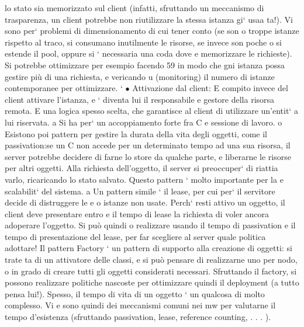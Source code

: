 \documentclass[a4paper,12pt]{article}
\begin{document}
lo stato sia memorizzato sul client (infatti, sfruttando un meccanismo di
trasparenza, un client potrebbe non riutilizzare la stessa istanza gi` usaa
ta!). Vi sono per` problemi di dimensionamento di cui tener conto (se son
o
troppe istanze rispetto al traco, si consumano inutilmente le risorse, se
invece son poche o si estende il pool, oppure si ` necessaria una coda dove
e
memorizzare le richieste). Si potrebbe ottimizzare per esempio facendo
59
in modo che gni istanza possa gestire più di una richiesta, e vericando
u
(monitoring) il numero di istanze contemporanee per ottimizzare.
`
$\bullet$ Attivazione dal client: E compito invece del client attivare l'istanza, e
`
diventa lui il responsabile e gestore della risorsa remota. E una logica
spesso scelta, che garantisce al client di utilizzare un'entit` a lui riservata.
a
Si ha per` un accoppiamento forte fra C e sessione di lavoro.
o
Esistono poi pattern per gestire la durata della vita degli oggetti, come il passivation:se un C non accede per un
determinato tempo ad una sua risorsa, il
server potrebbe decidere di farne lo store da qualche parte, e liberarne le risorse
per altri oggetti. Alla richiesta dell'oggetto, il server si preoccuper` di riattia
varlo, ricaricando lo stato salvato. Questo pattern ` molto importante per la
e
scalabilit` del sistema.
a
Un pattern simile ` il lease, per cui per` il servitore decide di distruggere le
e
o
istanze non usate. Perch` resti attivo un oggetto, il client deve presentare entro
e
il tempo di lease la richiesta di voler ancora adoperare l'oggetto. Si può quindi
o
realizzare usando il tempo di passivation e il tempo di presentazione del lease,
per far scegliere al server quale politica adottare!
Il pattern Factory ` un pattern di supporto alla creazione di oggetti: si trate
ta di un attivatore delle classi, e si può pensare di realizzarne uno per nodo,
o
in grado di creare tutti gli oggetti considerati necessari. Sfruttando il factory,
si possono realizzare politiche nascoste per ottimizzare quindi il deployment (a
tutto pensa lui!).
Spesso, il tempo di vita di un oggetto ` un qualcosa di molto complesso. Vi
e
sono quindi dei meccanismi comuni nei mw per valutarne il tempo d'esistenza
(sfruttando passivation, lease, reference counting, . . . ).
\end{document}
